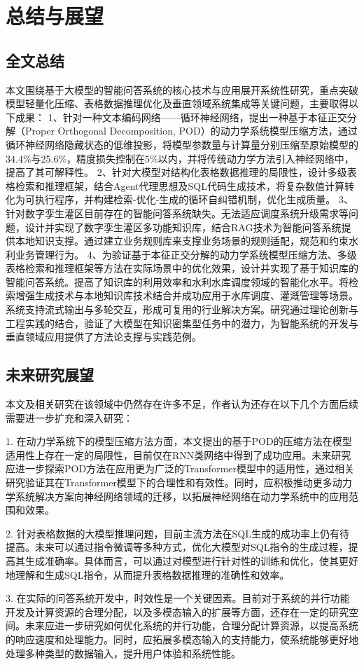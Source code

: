 \chapter{总结与展望}
\label{cha:第六章}
\section{全文总结}
本文围绕基于大模型的智能问答系统的核心技术与应用展开系统性研究，重点突破模型轻量化压缩、表格数据推理优化及垂直领域系统集成等关键问题，主要取得以下成果：    1、针对一种文本编码网络——循环神经网络，提出一种基于本征正交分解（Proper Orthogonal Decomposition, POD）的动力学系统模型压缩方法，通过循环神经网络隐藏状态的低维投影，将模型参数量与计算量分别压缩至原始模型的34.4\%与25.6\%，精度损失控制在5\%以内，并将传统动力学方法引入神经网络中，提高了其可解释性。
2、针对大模型对结构化表格数据推理的局限性，设计多级表格检索和推理框架，结合Agent代理思想及SQL代码生成技术，将复杂数值计算转化为可执行程序，并构建检索-优化-生成的循环自纠错机制，优化生成质量。
3、针对数字孪生灌区目前存在的智能问答系统缺失。无法适应调度系统升级需求等问题，设计并实现了数字孪生灌区多功能知识库，结合RAG技术为智能问答系统提供本地知识支撑。通过建立业务规则库来支撑业务场景的规则适配，规范和约束水利业务管理行为。
4、为验证基于本征正交分解的动力学系统模型压缩方法、多级表格检索和推理框架等方法在实际场景中的优化效果，设计并实现了基于知识库的智能问答系统。提高了知识库的利用效率和水利水库调度领域的智能化水平。将检索增强生成技术与本地知识库技术结合并成功应用于水库调度、灌溉管理等场景。系统支持流式输出与多轮交互，形成可复用的行业解决方案。研究通过理论创新与工程实践的结合，验证了大模型在知识密集型任务中的潜力，为智能系统的开发与垂直领域应用提供了方法论支撑与实践范例。
\section{未来研究展望}
本文及相关研究在该领域中仍然存在许多不足，作者认为还存在以下几个方面后续需要进一步扩充和深入研究：

1.	在动力学系统下的模型压缩方法方面，本文提出的基于POD的压缩方法在模型适用性上存在一定的局限性，目前仅在RNN类网络中得到了成功应用。未来研究应进一步探索POD方法在应用更为广泛的Transformer模型中的适用性，通过相关研究验证其在Transformer模型下的合理性和有效性。同时，应积极推动更多动力学系统解决方案向神经网络领域的迁移，以拓展神经网络在动力学系统中的应用范围和效果。

2.	针对表格数据的大模型推理问题，目前主流方法在SQL生成的成功率上仍有待提高。未来可以通过指令微调等多种方式，优化大模型对SQL指令的生成过程，提高其生成准确率。具体而言，可以通过对模型进行针对性的训练和优化，使其更好地理解和生成SQL指令，从而提升表格数据推理的准确性和效率。

3.	在实际的问答系统开发中，时效性是一个关键因素。目前对于系统的并行功能开发及计算资源的合理分配，以及多模态输入的扩展等方面，还存在一定的研究空间。未来应进一步研究如何优化系统的并行功能，合理分配计算资源，以提高系统的响应速度和处理能力。同时，应拓展多模态输入的支持能力，使系统能够更好地处理多种类型的数据输入，提升用户体验和系统性能。
